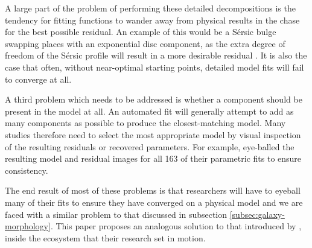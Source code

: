 \documentclass[../main.tex]{subfiles}
\begin{document}
A large part of the problem of performing these detailed decompositions is the tendency for fitting functions to wander away from physical results in the chase for the best possible residual. An example of this would be a S\'ersic bulge swapping places with an exponential disc component, as the extra degree of freedom of the S\'ersic profile will result in a more desirable residual \citep{Kruk2017:1705.00007v1}. It is also the case that often, without near-optimal starting points, detailed model fits will fail to converge at all.

A third problem which needs to be addressed is whether a component should be present in the model at all. An automated fit will generally attempt to add as many components as possible to produce the closest-matching model. Many studies therefore need to select the most appropriate model by visual inspection of the resulting residuals or recovered parameters. For example, \citet{Vika2014:1408.4070v1} eye-balled the resulting model and residual images for all 163 of their parametric fits to ensure consistency.

The end result of most of these problems is that researchers will have to eyeball many of their fits to ensure they have converged on a physical model and we are faced with a similar problem to that discussed in subsection \ref{subsec:galaxy-morphology}. This paper proposes an analogous solution to that introduced by \cite{Lintott2008:0804.4483v1}, inside the ecosystem that their research set in motion.

\end{document}
